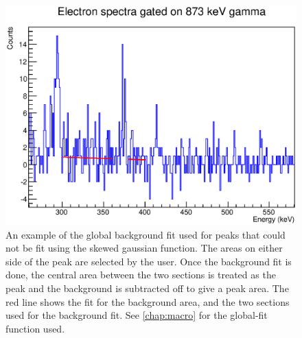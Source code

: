 \begin{figure}
    \centering
    \includegraphics[scale=0.6]{Analysis_Figs/Piecewise_example.eps}
    \caption[An example of the global background fit used for peaks that could not be fit using the skewed gaussian function.]{An example of the global background fit used for peaks that could not be fit using the skewed gaussian function. The areas on either side of the peak are selected by the user. Once the background fit is done, the central area between the two sections is treated as the peak and the background is subtracted off to give a peak area. The red line shows the fit for the background area, and the two sections used for the background fit. See \ref{chap:macro} for the global-fit function used.}
    \label{fig:piecewise}
\end{figure}